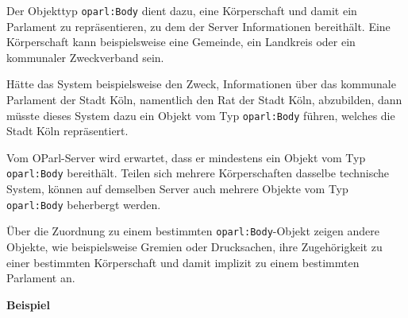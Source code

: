 \documentclass[,a4paper]{article}
\begin{document}

Der Objekttyp \texttt{oparl:Body} dient dazu, eine Körperschaft und
damit ein Parlament zu repräsentieren, zu dem der Server Informationen
bereithält. Eine Körperschaft kann beispielsweise eine Gemeinde, ein
Landkreis oder ein kommunaler Zweckverband sein.

Hätte das System beispielsweise den Zweck, Informationen über das
kommunale Parlament der Stadt Köln, namentlich den Rat der Stadt Köln,
abzubilden, dann müsste dieses System dazu ein Objekt vom Typ
\texttt{oparl:Body} führen, welches die Stadt Köln repräsentiert.

Vom OParl-Server wird erwartet, dass er mindestens ein Objekt vom Typ
\texttt{oparl:Body} bereithält. Teilen sich mehrere Körperschaften
dasselbe technische System, können auf demselben Server auch mehrere
Objekte vom Typ \texttt{oparl:Body} beherbergt werden.

Über die Zuordnung zu einem bestimmten \texttt{oparl:Body}-Objekt zeigen
andere Objekte, wie beispielsweise Gremien oder Drucksachen, ihre
Zugehörigkeit zu einer bestimmten Körperschaft und damit implizit zu
einem bestimmten Parlament an.

\textbf{Beispiel}
\end{document}
